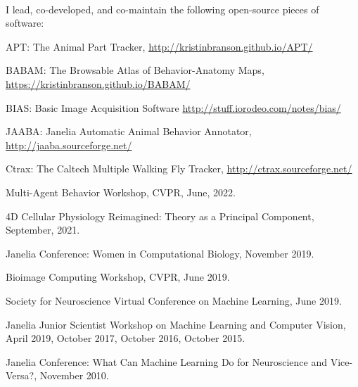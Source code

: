 \documentclass[11pt, letterpaper]{awesome-cv}
\begin{document}
%

\vspace{\acvSectionContentTopSkip}\\
I lead, co-developed, and co-maintain the following open-source pieces of software:\\
\begin{cvitems}
\item APT: The Animal Part Tracker, \url{http://kristinbranson.github.io/APT/}
  \item BABAM: The Browsable Atlas of Behavior-Anatomy Maps, \url{https://kristinbranson.github.io/BABAM/}
\item BIAS: Basic Image Acquisition Software \url{http://stuff.iorodeo.com/notes/bias/}
\item JAABA: Janelia Automatic Animal Behavior Annotator, \url{http://jaaba.sourceforge.net/}
\item Ctrax: The Caltech Multiple Walking Fly Tracker, \url{http://ctrax.sourceforge.net/}
\end{cvitems}
\vspace{\acvSectionContentTopSkip}

\vspace{\acvSectionContentTopSkip}
\vspace{2mm}
\begin{cvitems}
\item Multi-Agent Behavior Workshop, CVPR, June, 2022. 
\item 4D Cellular Physiology Reimagined: Theory as a Principal Component, September, 2021. 
\item Janelia Conference: Women in Computational Biology, November 2019.
\item Bioimage Computing Workshop, CVPR, June 2019.
\item Society for Neuroscience Virtual Conference on Machine Learning, June 2019.
\item Janelia Junior Scientist Workshop on Machine Learning and Computer Vision, April 2019, October 2017, October 2016, October 2015.
\item Janelia Conference: What Can Machine Learning Do for Neuroscience and Vice-Versa?, November 2010.
\end{cvitems}
\vspace{\acvSectionContentTopSkip}
\end{document}
